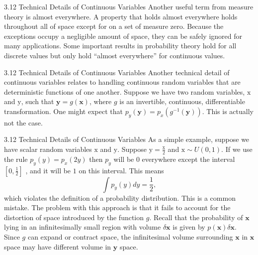 \begin{frame}{3.12 Technical Details of Continuous Variables}
    \justifying
    Another useful term from measure theory is almost everywhere. A property that holds almost everywhere holds throughout all of space except for on a set of measure zero. Because the exceptions occupy a negligible amount of space, they can be safely ignored for many applications. Some important results in probability theory hold for all discrete values but only hold ``almost everywhere'' for continuous values.
\end{frame}

\begin{frame}{3.12 Technical Details of Continuous Variables}
    \justifying
    Another technical detail of continuous variables relates to handling continuous random variables that are deterministic functions of one another. Suppose we have two random variables, $\boldsymbol{\mathrm{x}}$ and $\boldsymbol{\mathrm{y}}$, such that $\boldsymbol{y} = g(\boldsymbol{x})$, where $g$ is an invertible, continuous, differentiable transformation. One might expect that $p_{y}(\boldsymbol{y}) = p_{x}(g^{-1}(\boldsymbol{y}))$. This is actually not the case.
\end{frame}

\begin{frame}{3.12 Technical Details of Continuous Variables}
    \justifying
    As a simple example, suppose we have scalar random variables $\mathrm{x}$ and $\mathrm{y}$. Suppose $\mathrm{y} = \frac{\mathrm{x}}{2}$ and $\mathrm{x} \sim U(0, 1)$. If we use the rule $p_{y}(y) = p_{x}(2y)$ then $p_{y}$ will be $0$ everywhere except the interval $[0, \frac{1}{2}]$ , and it will be $1$ on this interval. This means
    \begin{equation}
        \int p_{y}(y)dy = \frac{1}{2},
        \label{eq:3_43}
    \end{equation}
    which violates the definition of a probability distribution. This is a common mistake. The problem with this approach is that it fails to account for the distortion of space introduced by the function $g$. Recall that the probability of $\boldsymbol{x}$ lying in an infinitesimally small region with volume $\delta\boldsymbol{x}$ is given by $p(\boldsymbol{x})\delta\boldsymbol{x}$. Since $g$ can expand or contract space, the infinitesimal volume surrounding $\boldsymbol{x}$ in $\boldsymbol{x}$ space may have different volume in $\boldsymbol{y}$ space.
\end{frame}

